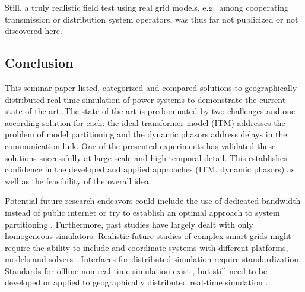 \documentclass[a4paper]{atseminar}
\begin{document}
Still, a truly realistic field test using real grid models, e.g.~among cooperating transmission or distribution system operators, was thus far not publicized or not discovered here.


\subsection{Conclusion}


This seminar paper listed, categorized and compared solutions to geographically distributed real-time simulation of power systems to demonstrate the current state of the art. The state of the art is predominated by two challenges and one according solution for each: the ideal transformer model (ITM) addresses the problem of model partitioning and the dynamic phasors address delays in the communication link. One of the presented experiments has validated these solutions successfully at large scale and high temporal detail. This establishes confidence in the developed and applied approaches (ITM, dynamic phasors) as well as the feasibility of the overall idea.

Potential future research endeavors could include the use of dedicated bandwidth instead of public internet or try to establish an optimal approach to system partitioning \cite{montoya2020}. Furthermore, past studies have largely dealt with only homogeneous simulators. Realistic future studies of complex smart grids might require the ability to include and coordinate systems with different platforms, models and solvers \cite{syed2020standard, palensky2017}. Interfaces for distributed simulation
require standardization. Standards for offline non-real-time simulation exist \cite{dcp}, but still need to be developed or applied to geographically distributed real-time simulation \cite{syed2020standard}.


%
\printbibliography


\end{document}
